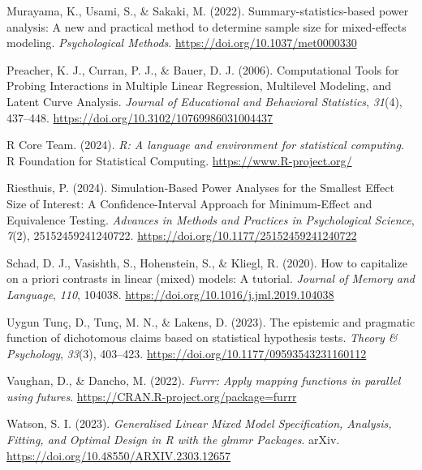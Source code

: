 \documentclass[
  man,
  floatsintext,
  longtable,
  a4paper,
  nolmodern,
  notxfonts,
  notimes,
  colorlinks=true,linkcolor=blue,citecolor=blue,urlcolor=blue]{apa7}
\newlength{\cslhangindent}
\newenvironment{CSLReferences}[2] %
 {\begin{list}{}{%
  \setlength{\itemindent}{0pt}
  \setlength{\leftmargin}{0pt}
  \setlength{\parsep}{0pt}
  \ifodd #1
   \setlength{\leftmargin}{\cslhangindent}
   \setlength{\itemindent}{-1\cslhangindent}
  \fi
  \setlength{\itemsep}{#2\baselineskip}}}
 {\end{list}}
\begin{document}
\begin{CSLReferences}{1}{0}
Murayama, K., Usami, S., \& Sakaki, M. (2022). Summary-statistics-based
power analysis: {A} new and practical method to determine sample size
for mixed-effects modeling. \emph{Psychological Methods}.
\url{https://doi.org/10.1037/met0000330}

Preacher, K. J., Curran, P. J., \& Bauer, D. J. (2006). Computational
{Tools} for {Probing Interactions} in {Multiple Linear Regression},
{Multilevel Modeling}, and {Latent Curve Analysis}. \emph{Journal of
Educational and Behavioral Statistics}, \emph{31}(4), 437--448.
\url{https://doi.org/10.3102/10769986031004437}

R Core Team. (2024). \emph{R: A language and environment for statistical
computing}. R Foundation for Statistical Computing.
\url{https://www.R-project.org/}

Riesthuis, P. (2024). Simulation-{Based Power Analyses} for the
{Smallest Effect Size} of {Interest}: {A Confidence-Interval Approach}
for {Minimum-Effect} and {Equivalence Testing}. \emph{Advances in
Methods and Practices in Psychological Science}, \emph{7}(2),
25152459241240722. \url{https://doi.org/10.1177/25152459241240722}

Schad, D. J., Vasishth, S., Hohenstein, S., \& Kliegl, R. (2020). How to
capitalize on a priori contrasts in linear (mixed) models: {A} tutorial.
\emph{Journal of Memory and Language}, \emph{110}, 104038.
\url{https://doi.org/10.1016/j.jml.2019.104038}

Uygun Tunç, D., Tunç, M. N., \& Lakens, D. (2023). The epistemic and
pragmatic function of dichotomous claims based on statistical hypothesis
tests. \emph{Theory \& Psychology}, \emph{33}(3), 403--423.
\url{https://doi.org/10.1177/09593543231160112}

Vaughan, D., \& Dancho, M. (2022). \emph{Furrr: Apply mapping functions
in parallel using futures}.
\url{https://CRAN.R-project.org/package=furrr}

Watson, S. I. (2023). \emph{Generalised {Linear Mixed Model
Specification}, {Analysis}, {Fitting}, and {Optimal Design} in {R} with
the glmmr {Packages}}. arXiv.
\url{https://doi.org/10.48550/ARXIV.2303.12657}


\end{CSLReferences}
\end{document}
